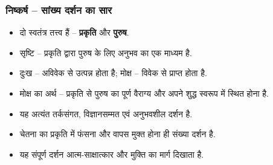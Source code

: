 \begin{frame}[fragile]\frametitle{निष्कर्ष – सांख्य दर्शन का सार}
\begin{itemize}
  \item दो स्वतंत्र तत्त्व हैं – \textbf{प्रकृति} और \textbf{पुरुष}.
  \item सृष्टि – प्रकृति द्वारा पुरुष के लिए अनुभव का एक माध्यम है.
  \item दुःख – अविवेक से उत्पन्न होता है; मोक्ष – विवेक से प्राप्त होता है.
  \item मोक्ष का अर्थ – प्रकृति से पुरुष का पूर्ण वैराग्य और अपने शुद्ध स्वरूप में स्थित होना है.
  \item यह अत्यंत तर्कसंगत, विज्ञानसम्मत एवं अनुभवशील दर्शन है.
  \item चेतना का प्रकृति में फंसना और वापस मुक्त होना ही संख्या दर्शन है.
  \item यह संपूर्ण दर्शन आत्म-साक्षात्कार और मुक्ति का मार्ग दिखाता है.
\end{itemize}
\end{frame}